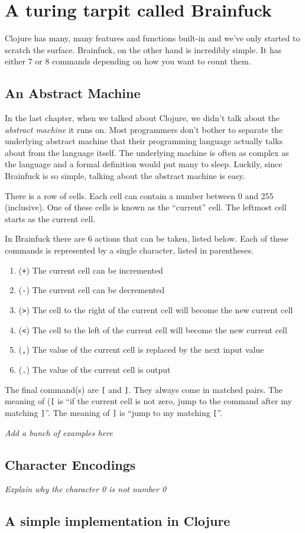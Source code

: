 \chapter{A turing tarpit called Brainfuck}

Clojure has many, many features and functions built-in and we've only
started to scratch the surface.  Brainfuck, on the other hand is
incredibly simple.  It has either 7 or 8 commands depending on how you
want to count them.

\section{An Abstract Machine}

In the last chapter, when we talked about Clojure, we didn't talk
about the {\em abstract machine} it runs on.  Most programmers don't
bother to separate the underlying abstract machine that their
programming language actually talks about from the language itself.
The underlying machine is often as complex as the language and a
formal definition would put many to sleep.  Luckily, since Brainfuck
is so simple, talking about the abstract machine is easy.

There is a row of cells. Each cell can contain a number between 0 and
255 (inclusive).  One of these cells is known as the ``current''
cell.  The leftmost cell starts as the current cell.

In Brainfuck there are 6 actions that can be taken, listed below. Each of these commands is represented by a single character, listed in parentheses.

\begin{enumerate}
\item ({\tt +}) The current cell can be incremented
\item ({\tt -}) The current cell can be decremented
\item ({\tt >}) The cell to the right of the current cell will become the new
  current cell
\item ({\tt <}) The cell to the left of the current cell will become the new
  current cell
\item ({\tt ,}) The value of the current cell is replaced by the next input value
\item ({\tt .}) The value of the current cell is output
\end{enumerate}

The final command(s) are {\tt [} and {\tt ]}.  They always come in
matched pairs.  The meaning of ({\tt [} is ``if the current cell is
not zero, jump to the command after my matching {\tt ]}''. The
meaning of {\tt ]} is ``jump to my matching {\tt [}''.

{\em Add a bunch of examples here}

\section{Character Encodings}

{\em Explain why the character 0 is not number 0}

\section{A simple implementation in Clojure}

